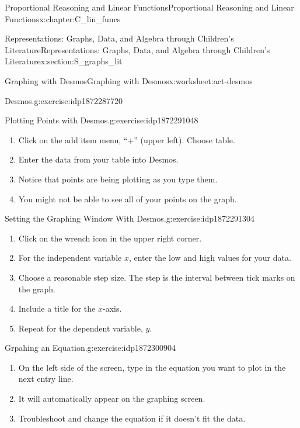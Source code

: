 \documentclass[oneside,10pt,]{book}
\numberwithin{equation}{chapter}
\begin{document}
\begin{chapterptx}{Proportional Reasoning and Linear Functions}{}{Proportional Reasoning and Linear Functions}{}{}{x:chapter:C_lin_funcs}
\begin{sectionptx}{Representations: Graphs, Data, and Algebra through Children's Literature}{}{Representations: Graphs, Data, and Algebra through Children's Literature}{}{}{x:section:S_graphs_lit}
\begin{worksheet-subsection}{Graphing with Desmos}{}{Graphing with Desmos}{}{}{x:worksheet:act-desmos}
\begin{divisionexercise}{1}{Desmos.}{}{g:exercise:idp1872287720}
\begin{enumerate}[font=\bfseries,label=(\alph*),ref=\alph*]
\end{enumerate}
\end{divisionexercise}%
\begin{divisionexercise}{2}{Plotting Points with Desmos.}{}{g:exercise:idp1872291048}%
\begin{enumerate}[font=\bfseries,label=(\alph*),ref=\alph*]
\item{}Click on the add item menu, ``+'' (upper left). Choose table.%
\item{}Enter the data from your table into Desmos.%
\item{}Notice that points are being plotting as you type them.%
\item{}You might not be able to see all of your points on the graph.%
\end{enumerate}
\end{divisionexercise}%
\begin{divisionexercise}{3}{Setting the Graphing Window With Desmos.}{}{g:exercise:idp1872291304}%
\begin{enumerate}[font=\bfseries,label=(\alph*),ref=\alph*]
\item{}Click on the wrench icon in the upper right corner.%
\item{}For the independent variable \(x\), enter the low and high values for your data.%
\item{}Choose a reasonable step size. The step is the interval between tick marks on the graph.%
\item{}Include a title for the \(x\)-axis.%
\item{}Repeat for the dependent variable, \(y\).%
\end{enumerate}
\end{divisionexercise}%
\begin{divisionexercise}{4}{Grpahing an Equation.}{}{g:exercise:idp1872300904}%
\begin{enumerate}[font=\bfseries,label=(\alph*),ref=\alph*]
\item{}On the left side of the screen, type in the equation you want to plot in the next entry line.%
\item{}It will automatically appear on the graphing screen.%
\item{}Troubleshoot and change the equation if it doesn't fit the data.%
\end{enumerate}
\end{divisionexercise}%
\end{worksheet-subsection}
\restoregeometry
%
%
\typeout{************************************************}

\end{sectionptx}
\end{chapterptx}
\end{document}
